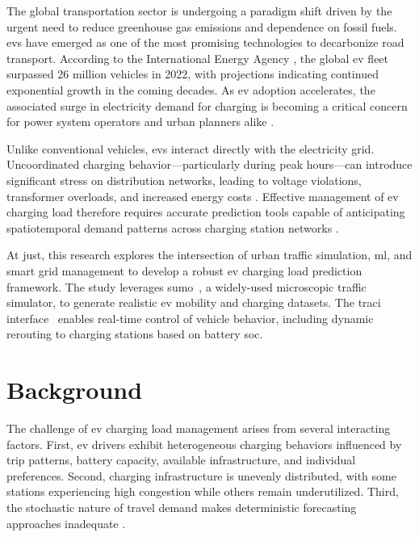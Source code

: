 \documentclass{thesis-library}
\begin{document}
\newpage
{}

\newpage

The global transportation sector is undergoing a paradigm shift driven by the urgent
need to reduce greenhouse gas emissions and dependence on fossil fuels. \Gls{ev}s have
emerged as one of the most promising technologies to decarbonize road transport. According
to the International Energy Agency \cite{ev_growth2023}, the global \Gls{ev} fleet
surpassed 26 million vehicles in 2022, with projections indicating continued exponential
growth in the coming decades. As \Gls{ev} adoption accelerates, the associated surge in
electricity demand for charging is becoming a critical concern for power system operators
and urban planners alike \cite{smart_charging2022}.

Unlike conventional vehicles, \Gls{ev}s interact directly with the electricity grid.
Uncoordinated charging behavior—particularly during peak hours—can introduce significant
stress on distribution networks, leading to voltage violations, transformer overloads, and
increased energy costs \cite{peak_load_shaving2021}. Effective management of \Gls{ev}
charging load therefore requires accurate prediction tools capable of anticipating
spatiotemporal demand patterns across charging station networks \cite{ml_ev_load2021}.

At \Gls{just}, this research explores the intersection of urban traffic simulation,
\Gls{ml}, and smart grid management to develop a robust \Gls{ev} charging load prediction
framework. The study leverages \Gls{sumo}~\cite{sumo2018}, a widely-used microscopic
traffic simulator, to generate realistic \Gls{ev} mobility and charging datasets. The
\Gls{traci} interface~\cite{traci2012} enables real-time control of vehicle behavior,
including dynamic rerouting to charging stations based on battery \Gls{soc}.

\section{Background}

The challenge of \Gls{ev} charging load management arises from several interacting
factors. First, \Gls{ev} drivers exhibit heterogeneous charging behaviors influenced by
trip patterns, battery capacity, available infrastructure, and individual preferences.
Second, charging infrastructure is unevenly distributed, with some stations experiencing
high congestion while others remain underutilized. Third, the stochastic nature of travel
demand makes deterministic forecasting approaches inadequate \cite{ev_simulation2020}.
\end{document}
